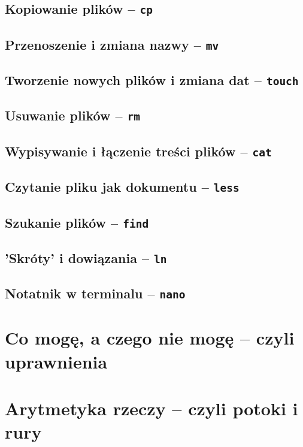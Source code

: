 \documentclass[11pt, a4paper]{article}
\newcommand{\ttbf}[1]{
    \texttt{\textbf{#1}}
}
\begin{document}
\subsection{Kopiowanie plików -- \ttbf{cp}}

\subsection{Przenoszenie i zmiana nazwy -- \ttbf{mv}}

\subsection{Tworzenie nowych plików i zmiana dat -- \ttbf{touch}}

\subsection{Usuwanie plików -- \ttbf{rm}}

\subsection{Wypisywanie i łączenie treści plików -- \ttbf{cat}}

\subsection{Czytanie pliku jak dokumentu -- \ttbf{less}}

\subsection{Szukanie plików -- \ttbf{find}}

\subsection{'Skróty' i dowiązania -- \ttbf{ln}}

\subsection{Notatnik w terminalu -- \ttbf{nano}}

\section{Co mogę, a czego nie mogę -- czyli uprawnienia}
\label{sec:perms}

\section{Arytmetyka rzeczy -- czyli potoki i rury}
\end{document}
